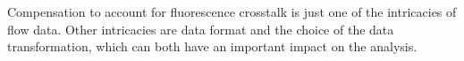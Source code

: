 
Compensation to account for fluorescence crosstalk is just one of the intricacies of flow data.
Other intricacies are data format
and the choice of
the data transformation,
which can both have an important impact on the analysis.

